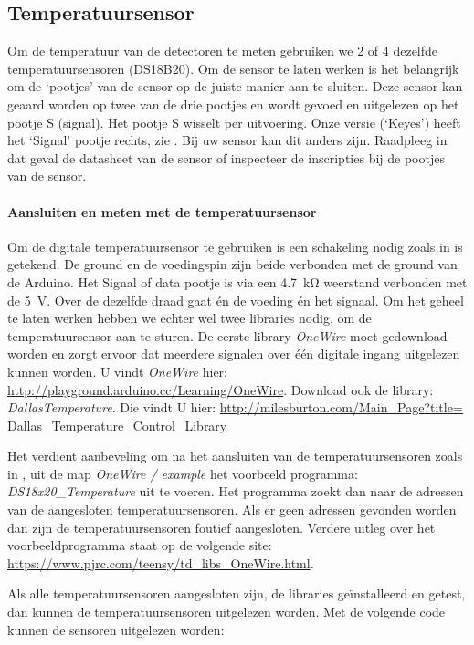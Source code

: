\subsection{Temperatuursensor}

Om de temperatuur van de detectoren te meten gebruiken we 2 of 4
dezelfde temperatuursensoren (DS18B20). Om de sensor te laten werken is
het belangrijk om de `pootjes' van de sensor op de juiste manier aan te
sluiten. Deze sensor kan geaard worden op twee van de drie pootjes en
wordt gevoed en uitgelezen op het pootje S (signal). Het pootje S
wisselt per uitvoering. Onze versie (`Keyes') heeft het `Signal' pootje
rechts,  zie . Bij uw sensor kan dit anders zijn.
Raadpleeg in dat geval de datasheet van de sensor of inspecteer de
inscripties bij de pootjes van de sensor.

\paragraph{Aansluiten en meten met de temperatuursensor}

Om de digitale temperatuursensor te gebruiken is een schakeling nodig
zoals in  is getekend. De ground en de
voedingspin zijn beide verbonden met de ground van de Arduino. Het
Signal of data pootje is via een \SI{4.7}{\kilo\ohm} weerstand verbonden
met de \SI{5}{\volt}. Over de dezelfde draad gaat én de voeding én het
signaal. Om het geheel te laten werken hebben we echter wel twee
libraries nodig, om de temperatuursensor aan te sturen. De eerste
library \emph{OneWire} moet gedownload worden en zorgt ervoor dat
meerdere signalen over één digitale ingang uitgelezen kunnen worden. U
vindt \emph{OneWire} hier:
\url{http://playground.arduino.cc/Learning/OneWire}. Download ook de
library: \emph{DallasTemperature}. Die vindt U hier:
\url{http://milesburton.com/Main_Page?title=
Dallas_Temperature_Control_Library}

Het verdient aanbeveling om na het aansluiten van de temperatuursensoren
zoals in , uit de map \emph{OneWire /
example} het voorbeeld programma: \emph{DS18x20\_Temperature} uit te
voeren. Het programma zoekt dan naar de adressen van de aangesloten
temperatuursensoren. Als er geen adressen gevonden worden dan zijn de
temperatuursensoren foutief aangesloten. Verdere uitleg over het
voorbeeldprogramma staat op de volgende site:
\url{https://www.pjrc.com/teensy/td_libs_OneWire.html}.

Als alle temperatuursensoren aangesloten zijn, de libraries
ge\"{i}nstalleerd en getest, dan kunnen de temperatuursensoren
uitgelezen worden. Met de volgende code kunnen de sensoren uitgelezen
worden:


